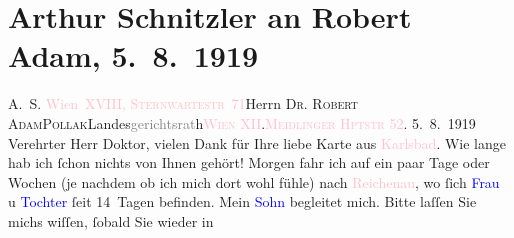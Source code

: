 

               \section[Arthur Schnitzler an Robert Adam, 5. 8. 1919]{ Arthur Schnitzler an Robert Adam, 5. 8. 1919}\nopagebreak{}\rehead{ }\normalsize\beginnumbering{} \toendnotes[C]{\smallbreak\pagebreak[2]} 
\toendnotes[C]{\smallbreak}\pstart{}{\pb}A. S. \textcolor{pink}{Wien XVIII, \textsc{Sternwartestr} 71}{}\ledrightnote{\textcolor{pink}{Sternwartestraße}}\pend{}{\bigskip}\pstart{}Herrn \textsc{Dr. Robert Adam}\pend{}\pstart{}\textsc{Pollak}\pend{}\pstart{}Landes\textcolor{gray}{gerichtsrat}h\pend{}\pstart{}\textcolor{pink}{\textsc{Wien} XII}{}\ledrightnote{\textcolor{pink}{XII., Meidling}}.\pend{}\pstart{}\textcolor{pink}{\textsc{Meidlinger Hptstr} 52}{}\ledrightnote{\textcolor{pink}{Meidlinger Hauptstraße}}. \pend{}{\bigskip}\pstart
           \raggedleft{}{\pb}5. 8. 1919\pend
           \pstart
           Verehrter Herr Doktor, vielen Dank für Ihre liebe Karte aus \textcolor{pink}{Karlsbad}{}\ledrightnote{\textcolor{pink}{Karlsbad}}. Wie lange hab ich ſchon nichts von
                    Ihnen gehört! Morgen fahr ich auf ein paar Tage oder Wochen (je nachdem ob ich
                    mich dort wohl fühle) nach \textcolor{pink}{Reichenau}{}\ledrightnote{\textcolor{pink}{Reichenau an der Rax}}, wo ſich
                        \textcolor{blue}{Frau}{} u \textcolor{blue}{Tochter}{} ſeit 14 Tagen
                    befinden. Mein \textcolor{blue}{Sohn}{}
                    begleitet mich. Bitte laſſen Sie michs wiſſen, ſobald Sie {\pb}wieder in
